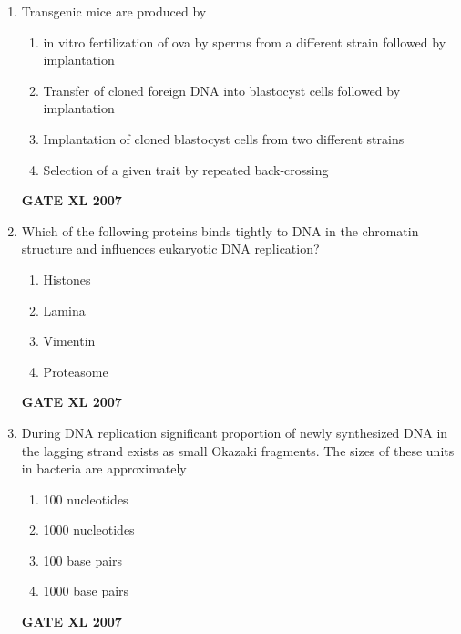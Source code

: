 \documentclass[journal,12pt,onecolumn]{IEEEtran}
\begin{document}
\begin{enumerate}
\item Transgenic mice are produced by
\begin{enumerate}
    \item in vitro fertilization of ova by sperms from a different strain followed by implantation
    \item Transfer of cloned foreign DNA into blastocyst cells followed by implantation
    \item Implantation of cloned blastocyst cells from two different strains
    \item Selection of a given trait by repeated back-crossing
\end{enumerate}\hfill{\textbf{GATE XL 2007}}

\item Which of the following proteins binds tightly to DNA in the chromatin structure and influences eukaryotic DNA replication?
\begin{enumerate}
    \item Histones
    \item Lamina
    \item Vimentin
    \item Proteasome
\end{enumerate}\hfill{\textbf{GATE XL 2007}}

\item During DNA replication significant proportion of newly synthesized DNA in the lagging strand exists as small Okazaki fragments. The sizes of these units in bacteria are approximately
\begin{enumerate}
    \item 100 nucleotides
    \item 1000 nucleotides
    \item 100 base pairs
    \item 1000 base pairs
\end{enumerate}\hfill{\textbf{GATE XL 2007}}


\end{enumerate}
\end{document}
